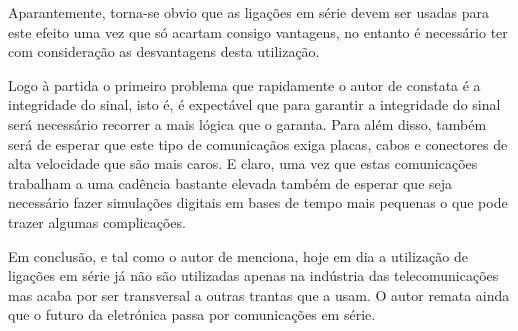 Aparantemente, torna-se obvio que as ligações em série devem ser usadas para este efeito uma vez que só acartam consigo vantagens, no entanto é necessário ter com consideração as desvantagens desta utilização. 

Logo à partida o primeiro problema que rapidamente o autor de \cite{R032} constata é a integridade do sinal, isto é, é expectável que para garantir a integridade do sinal será necessário recorrer a mais lógica que o garanta. Para além disso, também será de esperar que este tipo de comunicaçãos exiga placas, cabos e conectores de alta velocidade que são mais caros. E claro, uma vez que estas comunicações trabalham a uma cadência bastante elevada também de esperar que seja necessário fazer simulações digitais em bases de tempo mais pequenas o que pode trazer algumas complicações.

Em conclusão, e tal como o autor de \cite{R032} menciona, hoje em dia a utilização de ligações em série já não são utilizadas apenas na indústria das telecomunicações mas acaba por ser transversal a outras trantas que a usam. O autor remata ainda que o futuro da eletrónica passa por comunicações em série.





